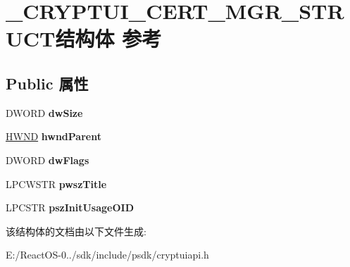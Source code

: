 \hypertarget{struct___c_r_y_p_t_u_i___c_e_r_t___m_g_r___s_t_r_u_c_t}{}\section{\+\_\+\+C\+R\+Y\+P\+T\+U\+I\+\_\+\+C\+E\+R\+T\+\_\+\+M\+G\+R\+\_\+\+S\+T\+R\+U\+C\+T结构体 参考}
\label{struct___c_r_y_p_t_u_i___c_e_r_t___m_g_r___s_t_r_u_c_t}
\subsection*{Public 属性}
\begin{DoxyCompactItemize}
\item 
\mbox{\label{struct___c_r_y_p_t_u_i___c_e_r_t___m_g_r___s_t_r_u_c_t_ae790f8b6ff7f2ea0acd46e4e4afb525b}} 
D\+W\+O\+RD {\bfseries dw\+Size}
\item 
\mbox{\label{struct___c_r_y_p_t_u_i___c_e_r_t___m_g_r___s_t_r_u_c_t_a1f0a633618ba94a6d17848d91b9534b1}} 
\hyperlink{interfacevoid}{H\+W\+ND} {\bfseries hwnd\+Parent}
\item 
\mbox{\label{struct___c_r_y_p_t_u_i___c_e_r_t___m_g_r___s_t_r_u_c_t_af8a208f5d1ba954384bbe6b4e91b1fcf}} 
D\+W\+O\+RD {\bfseries dw\+Flags}
\item 
\mbox{\label{struct___c_r_y_p_t_u_i___c_e_r_t___m_g_r___s_t_r_u_c_t_a85aefeb82c05d5ef4dbc8724a07ffe75}} 
L\+P\+C\+W\+S\+TR {\bfseries pwsz\+Title}
\item 
\mbox{\label{struct___c_r_y_p_t_u_i___c_e_r_t___m_g_r___s_t_r_u_c_t_a1d38d189d2f62b1d4965794c71f24dc6}} 
L\+P\+C\+S\+TR {\bfseries psz\+Init\+Usage\+O\+ID}
\end{DoxyCompactItemize}


该结构体的文档由以下文件生成\+:\begin{DoxyCompactItemize}
\item 
E\+:/\+React\+O\+S-\/0../sdk/include/psdk/cryptuiapi.\+h\end{DoxyCompactItemize}
